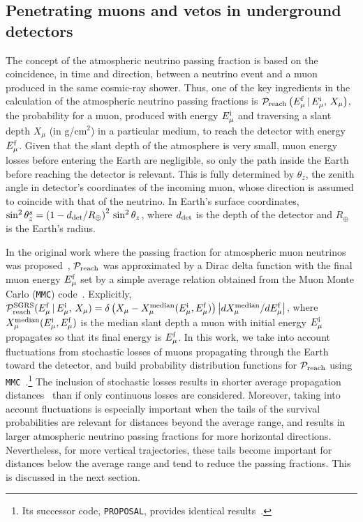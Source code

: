 \documentclass[aps,prd,showpacs,letterpaper,onecolumn,longbibliography,superscriptaddress,notitlepage,nofootinbib]{revtex4-1}%
\newcommand{\Emf}{E_{\mu}^{\rm f}}
\newcommand{\Emi}{E_{\mu}^{\rm i}}
\newcommand{\Prob}{{\cal P}}
\newcommand{\MMC}{\texttt{MMC}}
\newcommand{\PROPOSAL}{\texttt{PROPOSAL}}
\begin{document}
\subsection{Penetrating muons and vetos in underground detectors}
\label{sec:preach_plight}

The concept of the atmospheric neutrino passing fraction is based on the coincidence, in time and direction, between a neutrino event and a muon produced in the same cosmic-ray shower. Thus, one of the key ingredients in the calculation of the atmospheric neutrino passing fractions is $\Prob_{\rm reach}\left(\Emf \, | \, \Emi , \, X_\mu\right)$, the probability for a muon, produced with energy $\Emi$ and traversing a slant depth $X_\mu$ (in g/cm$^2$) in a particular medium, to reach the detector with energy $\Emf$. Given that the slant depth of the atmosphere is very small, muon energy losses before entering the Earth are negligible, so only the path inside the Earth before reaching the detector is relevant. This is fully determined by $\theta_z$, the zenith angle in detector's coordinates of the incoming muon, whose direction is assumed to coincide with that of the neutrino. In Earth's surface coordinates, $\sin^2 \theta_z^s = \left(1 - d_{\rm det}/R_\oplus\right)^2 \, \sin^2 \theta_z$, where $d_{\rm det}$ is the depth of the detector and $R_\oplus$ is the Earth's radius.

In the original work where the passing fraction for atmospheric muon neutrinos was proposed~\cite{Schonert:2008is}, $\Prob_{\rm reach}$ was approximated by a Dirac delta function with the final muon energy $\Emf$ set by a simple average relation obtained from the Muon Monte Carlo (\MMC) code~\cite{Chirkin:2004hz}. Explicitly, 
$\Prob_{\rm reach}^{\rm SGRS} (\Emf \, | \, \Emi , \, X_\mu) = \delta \left(X_\mu - X_{\mu}^{\rm median}(\Emi, \Emf)\right) \left|dX_{\mu}^{\rm median}/d \Emf \right|$,
where $X_{\mu}^{\rm median}(\Emi, \Emf)$ is the median slant depth a muon with initial energy $\Emi$ propagates so that its final energy is $\Emf$. In this work, we take into account fluctuations from stochastic losses of muons propagating through the Earth toward the detector, and build probability distribution functions for $\Prob_{\rm reach}$ using \MMC~\cite{Chirkin:2004hz}.\footnote{Its successor code, \PROPOSAL, provides identical results~\cite{Koehne:2013gpa}.} The inclusion of stochastic losses results in shorter average propagation distances~\cite{Lipari:1991ut} than if only continuous losses are considered. Moreover, taking into account fluctuations is especially important when the tails of the survival probabilities are relevant for distances beyond the average range, and results in larger atmospheric neutrino passing fractions for more horizontal directions. Nevertheless, for more vertical trajectories, these tails become important for distances below the average range and tend to reduce the passing fractions. This is discussed in the next section.
\end{document}
